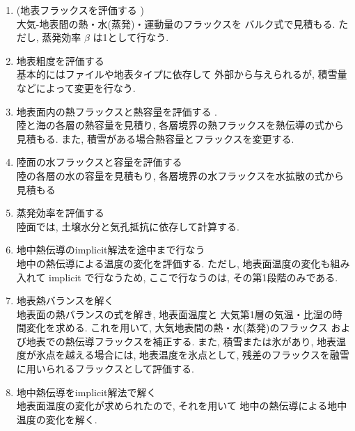 \begin{enumerate}
  \item (地表フラックスを評価する ) \\
            大気-地表間の熱・水(蒸発)・運動量のフラックスを
            バルク式で見積もる.
            ただし, 蒸発効率 $\beta$ は1として行なう.

  \item 地表粗度を評価する  \\
            基本的にはファイルや地表タイプに依存して
            外部から与えられるが, 
            積雪量などによって変更を行なう.

  \item 地表面内の熱フラックスと熱容量を評価する .
         \\
            陸と海の各層の熱容量を見積り,
            各層境界の熱フラックスを熱伝導の式から見積もる.
            また, 積雪がある場合熱容量とフラックスを変更する.

  \item 陸面の水フラックスと容量を評価する  \\
            陸の各層の水の容量を見積もり, 
            各層境界の水フラックスを水拡散の式から見積もる

  \item 蒸発効率を評価する  \\
            陸面では, 土壌水分と気孔抵抗に依存して計算する. 

  \item 地中熱伝導のimplicit解法を途中まで行なう  \\
            地中の熱伝導による温度の変化を評価する.
            ただし, 地表面温度の変化も組み入れて 
            implicit で行なうため, ここで行なうのは, その第1段階のみである.

  \item 地表熱バランスを解く  \\
            地表面の熱バランスの式を解き, 地表面温度と
            大気第1層の気温・比湿の時間変化を求める.
            これを用いて, 大気地表間の熱・水(蒸発)のフラックス
            および地表での熱伝導フラックスを補正する.
            また, 積雪または氷があり, 地表温度が氷点を越える場合には,
            地表温度を氷点として, 
            残差のフラックスを融雪に用いられるフラックスとして評価する.

  \item 地中熱伝導をimplicit解法で解く  \\
            地表面温度の変化が求められたので, それを用いて
            地中の熱伝導による地中温度の変化を解く.


\end{enumerate}
